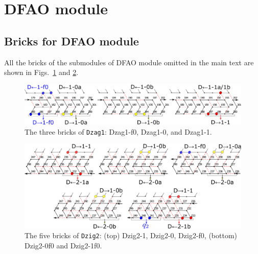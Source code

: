 \documentclass[runningheads]{llncs}
\begin{document}
	\section{DFAO module}
	\label{sect:appendix_DFAO_module}

	\subsection{Bricks for DFAO module}
	\label{ap_subsect:DFAO_module_bricks}

All the bricks of the submodules of DFAO module omitted in the main text are shown in Figs.~\ref{fig:Dzag1} and \ref{fig:Dzig2}. 

\begin{figure}[h]
\centering
\includegraphics[width=\linewidth]{Figs/DFAO-zag1.png}
\caption{The three bricks of \texttt{Dzag1}: Dzag1-f0, Dzag1-0, and Dzag1-1.}
\label{fig:Dzag1}
\end{figure}

\begin{figure}[h]
\centering
\includegraphics[width=\linewidth]{Figs/DFAO-zig2.png}
\caption{The five bricks of \texttt{Dzig2}: (top) Dzig2-1, Dzig2-0, Dzig2-f0, (bottom) Dzig2-0f0 and Dzig2-1f0. }
\label{fig:Dzig2}
\end{figure}
\end{document}

